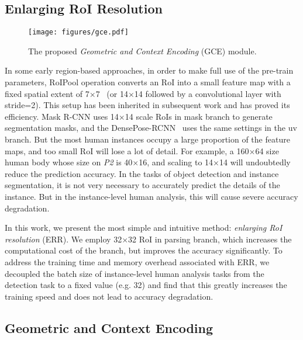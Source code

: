 \documentclass[10pt,twocolumn,letterpaper]{article}
\begin{document}
\subsection{Enlarging RoI Resolution}

\begin{figure}[t]
\begin{center}
\texttt{[image: figures/gce.pdf]}
\end{center}
\caption{The proposed  \emph{Geometric and Context Encoding} (GCE) module.}
\label{fig:gce_module}
\end{figure}


In some early region-based approaches, in order to make full use of the pre-train parameters, RoIPool operation converts an RoI into a small feature map with a fixed spatial extent of 7$\times$7~\cite{Girshick_iccv2015_fast-rcnn, Lin_cvpr2017_fpn, He_iccv2017_maskrcnn} (or 14$\times$14 followed by a convolutional layer with stride=2). This setup has been inherited in subsequent work and has proved its efficiency. Mask R-CNN uses 14$\times$14 scale RoIs in mask branch to generate segmentation masks, and the DensePose-RCNN~\cite{Guler_cvpr2018_densepose} uses the same settings in the uv branch. But the most human instances occupy a large proportion of the feature maps, and too small RoI will lose a lot of detail. For example, a 160$\times$64 size human body whose size on \emph{P2} is 40$\times$16, and scaling to 14$\times$14 will undoubtedly reduce the prediction accuracy. In the tasks of object detection and instance segmentation, it is not very necessary to accurately predict the details of the instance. But in the instance-level human analysis, this will cause severe accuracy degradation.

In this work, we present the most simple and intuitive method: \emph{enlarging RoI resolution} (ERR). We employ 32$\times$32 RoI in parsing branch, which increases the computational cost of the branch, but improves the accuracy significantly. To address the training time and memory overhead associated with ERR, we decoupled the batch size of instance-level human analysis tasks from the detection task to a fixed value (e.g. 32) and find that this greatly increases the training speed and does not lead to accuracy degradation.

\subsection{Geometric and Context Encoding}
\end{document}
